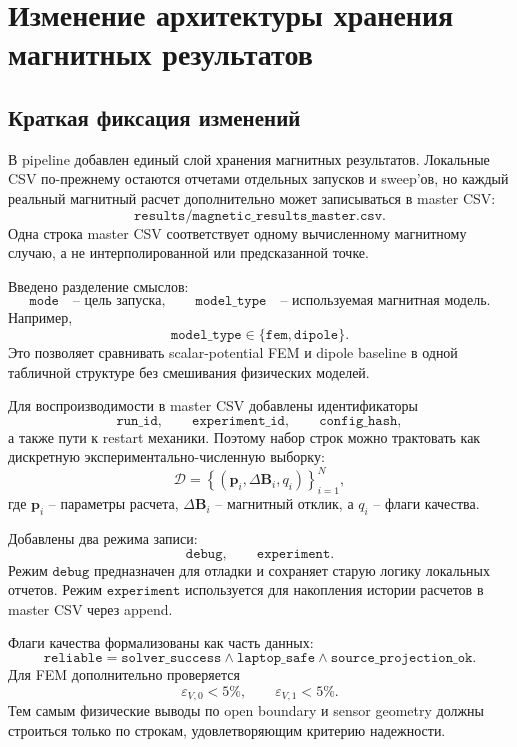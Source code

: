 \documentclass[12pt,a4paper]{article}
\begin{document}
\section{Изменение архитектуры хранения магнитных результатов}

\subsection*{Краткая фиксация изменений}

В pipeline добавлен единый слой хранения магнитных результатов. Локальные CSV
по-прежнему остаются отчетами отдельных запусков и sweep'ов, но каждый реальный
магнитный расчет дополнительно может записываться в master CSV:
\[
    \texttt{results/magnetic\_results\_master.csv}.
\]
Одна строка master CSV соответствует одному вычисленному магнитному случаю, а
не интерполированной или предсказанной точке.

Введено разделение смыслов:
\[
    \texttt{mode}
    \quad \text{-- цель запуска},
    \qquad
    \texttt{model\_type}
    \quad \text{-- используемая магнитная модель}.
\]
Например,
\[
    \texttt{model\_type}\in\{\texttt{fem},\texttt{dipole}\}.
\]
Это позволяет сравнивать scalar-potential FEM и dipole baseline в одной
табличной структуре без смешивания физических моделей.

Для воспроизводимости в master CSV добавлены идентификаторы
\[
    \texttt{run\_id},\qquad
    \texttt{experiment\_id},\qquad
    \texttt{config\_hash},
\]
а также пути к restart механики. Поэтому набор строк можно трактовать как
дискретную экспериментально-численную выборку:
\[
    \mathcal D =
    \left\{
        \left(\mathbf p_i,\Delta\mathbf B_i,q_i\right)
    \right\}_{i=1}^{N},
\]
где \(\mathbf p_i\) -- параметры расчета, \(\Delta\mathbf B_i\) -- магнитный
отклик, а \(q_i\) -- флаги качества.

Добавлены два режима записи:
\[
    \texttt{debug},\qquad
    \texttt{experiment}.
\]
Режим \(\texttt{debug}\) предназначен для отладки и сохраняет старую логику
локальных отчетов. Режим \(\texttt{experiment}\) используется для накопления
истории расчетов в master CSV через append.

Флаги качества формализованы как часть данных:
\[
    \texttt{reliable} =
    \texttt{solver\_success}
    \land
    \texttt{laptop\_safe}
    \land
    \texttt{source\_projection\_ok}.
\]
Для FEM дополнительно проверяется
\[
    \varepsilon_{V,0}<5\%,
    \qquad
    \varepsilon_{V,1}<5\%.
\]
Тем самым физические выводы по open boundary и sensor geometry должны строиться
только по строкам, удовлетворяющим критерию надежности.
\end{document}
